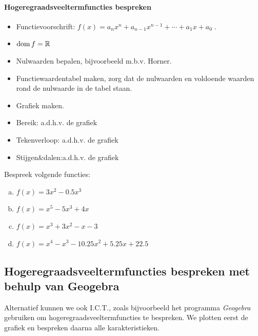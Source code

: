 \documentclass[12pt]{article}
\begin{document}
\paragraph*{Hogeregraadsveeltermfuncties bespreken}
\begin{mdframed}
\begin{itemize}
  \item Functievoorschrift: $f(x)= a_nx^n + a_{n-1}x^{n-1} + \cdots + a_1x + a_0\;.$
  \item $\dom f = \mathbb{R}$
  \item Nulwaarden bepalen, bijvoorbeeld m.b.v. Horner.
  \item Functiewaardentabel maken, zorg dat de nulwaarden en voldoende waarden rond de nulwaarde in de tabel staan.
  \item Grafiek maken.
  \item Bereik: a.d.h.v. de grafiek
  \item Tekenverloop: a.d.h.v. de grafiek
  \item Stijgen\&dalen:a.d.h.v. de grafiek
\end{itemize}
\end{mdframed}

\begin{oefening}
Bespreek volgende functies:
\begin{enumerate}[(a)]
  \item $f(x)=3x^2-0.5x^3$
  \item $f(x)=x^5-5x^3+4x$
  \item $f(x)=x^3+3x^2-x-3$
  \item $f(x)=x^4-x^3-10.25x^2+5.25x+22.5$
\end{enumerate}
\end{oefening}

\pagebreak
\subsection{Hogeregraadsveeltermfuncties bespreken met behulp van Geogebra}
Alternatief kunnen we ook I.C.T., zoals bijvoorbeeld het programma {\em Geogebra} gebruiken om hogeregraadsveeltermfuncties te bespreken. We plotten eerst de grafiek en bespreken daarna alle karakteristieken.
\end{document}
